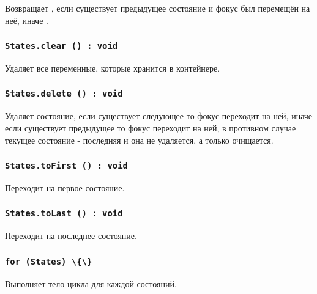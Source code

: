 Возвращает \true, если существует предыдущее состояние и фокус был перемещён на неё, иначе \false.

\subsubsection{\lstinline|States.clear () : void|}

Удаляет все переменные, которые хранится в контейнере.

\subsubsection{\lstinline|States.delete () : void|}

Удаляет состояние, если существует следующее то фокус переходит на ней, иначе если существует предыдущее то фокус переходит на ней, в противном случае текущее состояние - последняя и она не удаляется, а только очищается.

\subsubsection{\lstinline|States.toFirst () : void|}

Переходит на первое состояние.

\subsubsection{\lstinline|States.toLast () : void|}

Переходит на последнее состояние.

\subsubsection{\lstinline|for (States) \{\}|}

Выполняет тело цикла для каждой состояний.

